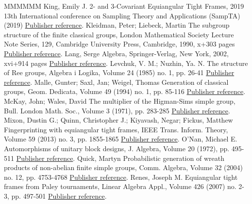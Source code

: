 \begin{thebibliography}{MMMMMM}
 King, Emily J. 2- and 3-Covariant Equiangular Tight Frames, 2019 13th International conference on Sampling Theory and Applications (SampTA) (2019) \href{https://alco.centre-mersenne.org/articles/10.5802/alco.324/#King:19}{Publisher reference}.
 Kleidman, Peter; Liebeck, Martin The subgroup structure of the finite classical groups, London Mathematical Society Lecture Note Series, 129, Cambridge University Press, Cambridge, 1990, x+303 pages \href{https://alco.centre-mersenne.org/articles/10.5802/alco.324/#KleidmanLiebeck:90}{Publisher reference}.
 Lang, Serge Algebra, Springer-Verlag, New York, 2002, xvi+914 pages \href{https://alco.centre-mersenne.org/articles/10.5802/alco.324/#Lang:02}{Publisher reference}.
 Levchuk, V. M.; Nuzhin, Ya. N. The structure of Ree groups, Algebra i Logika, Volume 24 (1985) no. 1, pp. 26-41 \href{https://alco.centre-mersenne.org/articles/10.5802/alco.324/#Levchuk:85}{Publisher reference}.
 Malle, Gunter; Saxl, Jan; Weigel, Thomas Generation of classical groups, Geom. Dedicata, Volume 49 (1994) no. 1, pp. 85-116 \href{https://alco.centre-mersenne.org/articles/10.5802/alco.324/#MSW:94}{Publisher reference}.
 McKay, John; Wales, David The multiplier of the Higman-Sims simple group, Bull. London Math. Soc., Volume 3 (1971), pp. 283-285 \href{https://alco.centre-mersenne.org/articles/10.5802/alco.324/#McKayWales:71}{Publisher reference}.
 Mixon, Dustin G.; Quinn, Christopher J.; Kiyavash, Negar; Fickus, Matthew Fingerprinting with equiangular tight frames, IEEE Trans. Inform. Theory, Volume 59 (2013) no. 3, pp. 1855-1865 \href{https://alco.centre-mersenne.org/articles/10.5802/alco.324/#MixonQuinnKiyavashFickus:13}{Publisher reference}.
 O’Nan, Michael E. Automorphisms of unitary block designs, J. Algebra, Volume 20 (1972), pp. 495-511 \href{https://alco.centre-mersenne.org/articles/10.5802/alco.324/#ONan:72}{Publisher reference}.
 Quick, Martyn Probabilistic generation of wreath products of non-abelian finite simple groups, Comm. Algebra, Volume 32 (2004) no. 12, pp. 4753-4768 \href{https://alco.centre-mersenne.org/articles/10.5802/alco.324/#Quick:04}{Publisher reference}.
 Renes, Joseph M. Equiangular tight frames from Paley tournaments, Linear Algebra Appl., Volume 426 (2007) no. 2-3, pp. 497-501 \href{https://alco.centre-mersenne.org/articles/10.5802/alco.324/#Renes:07}{Publisher reference}.

\end{thebibliography}
